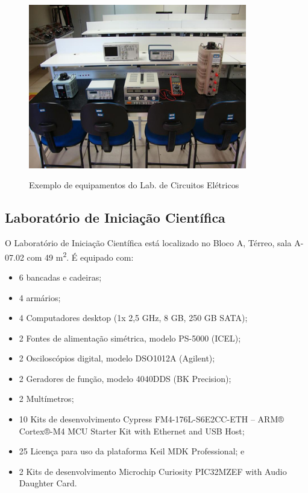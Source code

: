 \begin{figure}[!htb]
    \centering
    \caption{Exemplo de equipamentos do Lab. de Circuitos Elétricos}
    \includegraphics[width=0.85\textwidth]{Caps/Figs/lab006b.png}
    \fonte{\utf}
    \label{fig:lab006b}
\end{figure}


\subsection{Laboratório de Iniciação Científica}

O Laboratório de Iniciação Científica está localizado no Bloco A, Térreo, sala A-07.02 com 49 m\textsuperscript{2}. É equipado com:

\begin{itemize}
    \item 6 bancadas e cadeiras; 
    \item 4 armários; 
    \item 4 Computadores desktop (1x 2,5 GHz, 8 GB, 250 GB SATA);
    \item 2 Fontes de alimentação simétrica, modelo PS-5000 (ICEL);
    \item 2 Osciloscópios digital, modelo DSO1012A (Agilent);
    \item 2 Geradores de função, modelo 4040DDS (BK Precision);
    \item 2 Multímetros;
    \item 10 Kits de desenvolvimento Cypress FM4-176L-S6E2CC-ETH – ARM® Cortex®-M4 MCU Starter Kit with Ethernet and USB Host;
    \item 25	Licença para uso da plataforma Keil MDK Professional; e
    \item 2	 Kits de desenvolvimento Microchip Curiosity PIC32MZEF with Audio Daughter Card.    
\end{itemize}

